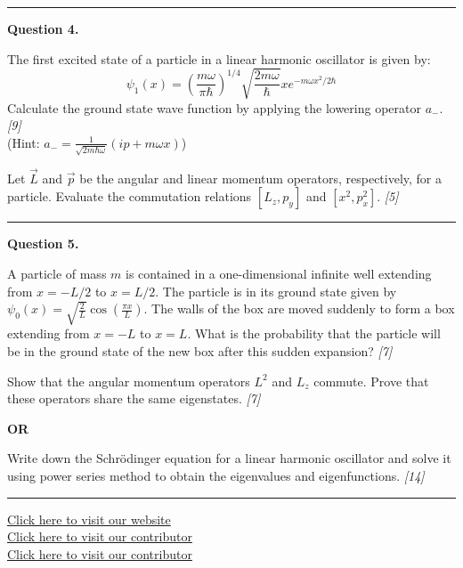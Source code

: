 \documentclass[11pt,a4paper]{article}
\newcommand{\pts}[1]{\hfill   \textit{[#1]}}
\begin{document}
\medskip\rule{\linewidth}{0.2pt}




\noindent   \textbf{Question 4.}

\begin{parts}
  \item The first excited state of a particle in a linear harmonic oscillator is given by:
    \[ \psi_1(x) = \left( \frac{m\omega}{\pi\hbar} \right)^{1/4} \sqrt{\frac{2m\omega}{\hbar}} x e^{-m\omega x^2 / 2\hbar} \]
    Calculate the ground state wave function by applying the lowering operator $a_-$. \pts{9} \\
    (Hint: $a_- = \frac{1}{\sqrt{2m\hbar\omega}} (ip + m\omega x)$)
  \item Let $\vec{L}$ and $\vec{p}$ be the angular and linear momentum operators, respectively, for a particle. Evaluate the commutation relations $[L_z, p_y]$ and $[x^2, p_x^2]$. \pts{5}
\end{parts}

\medskip\rule{\linewidth}{0.2pt}




\noindent   \textbf{Question 5.}

\begin{parts}
  \item A particle of mass $m$ is contained in a one-dimensional infinite well extending from $x = -L/2$ to $x = L/2$. The particle is in its ground state given by $\psi_0(x) = \sqrt{\frac{2}{L}} \cos\left( \frac{\pi x}{L} \right)$. The walls of the box are moved suddenly to form a box extending from $x = -L$ to $x = L$. What is the probability that the particle will be in the ground state of the new box after this sudden expansion? \pts{7}
  \item Show that the angular momentum operators $L^2$ and $L_z$ commute. Prove that these operators share the same eigenstates. \pts{7}
\end{parts}
\hfill   \textbf{OR}

\begin{parts}
  \item Write down the Schr\"{o}dinger equation for a linear harmonic oscillator and solve it using power series method to obtain the eigenvalues and eigenfunctions. \pts{14}
\end{parts}

\vfill
\rule{\linewidth}{0.4pt}

\begin{center}\small
  \href{https://bhu-exam.vercel.app/}{Click here to visit our website}\\[4pt]
  \href{https://me-aryan.vercel.app/}{Click here to visit our contributor}\\[4pt]
  \href{https://quashan-me.vercel.app/}{Click here to visit our contributor}
\end{center}
\end{document}
